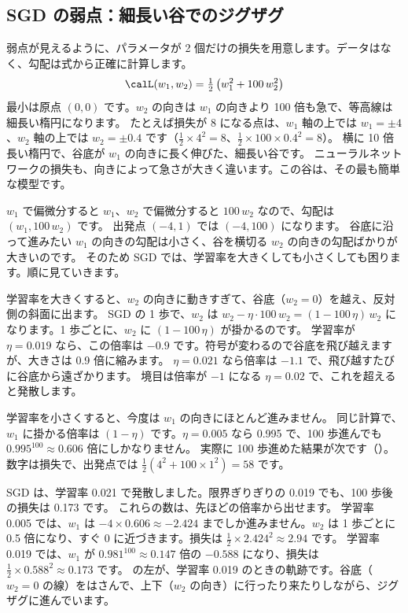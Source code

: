 \subsection*{SGD の弱点：細長い谷でのジグザグ}

弱点が見えるように、パラメータが 2 個だけの損失を用意します。データはなく、勾配は式から正確に計算します。
\begin{equation}
\calL(w_1, w_2)=\tfrac{1}{2}\left(w_1^2+100\,w_2^2\right)
\label{eq:training-valley}
\end{equation}
最小は原点 $(0,0)$ です。$w_2$ の向きは $w_1$ の向きより 100 倍も急で、等高線は細長い楕円になります。
たとえば損失が 8 になる点は、$w_1$ 軸の上では $w_1=\pm4$、$w_2$ 軸の上では $w_2=\pm0.4$ です（$\frac12\times4^2=8$、$\frac12\times100\times0.4^2=8$）。
横に 10 倍長い楕円で、谷底が $w_1$ の向きに長く伸びた、細長い谷です。
ニューラルネットワークの損失も、向きによって急さが大きく違います。この谷は、その最も簡単な模型です。

$w_1$ で偏微分すると $w_1$、$w_2$ で偏微分すると $100\,w_2$ なので、勾配は $(w_1, 100\,w_2)$ です。
出発点 $(-4, 1)$ では $(-4, 100)$ になります。
谷底に沿って進みたい $w_1$ の向きの勾配は小さく、谷を横切る $w_2$ の向きの勾配ばかりが大きいのです。
そのため SGD では、学習率を大きくしても小さくしても困ります。順に見ていきます。

学習率を大きくすると、$w_2$ の向きに動きすぎて、谷底（$w_2=0$）を越え、反対側の斜面に出ます。
SGD の 1 歩で、$w_2$ は $w_2-\eta\cdot100\,w_2=(1-100\,\eta)\,w_2$ になります。1 歩ごとに、$w_2$ に $(1-100\,\eta)$ が掛かるのです。
学習率が $\eta=0.019$ なら、この倍率は $-0.9$ です。符号が変わるので谷底を飛び越えますが、大きさは 0.9 倍に縮みます。
$\eta=0.021$ なら倍率は $-1.1$ で、飛び越すたびに谷底から遠ざかります。
境目は倍率が $-1$ になる $\eta=0.02$ で、これを超えると発散します。

学習率を小さくすると、今度は $w_1$ の向きにほとんど進みません。
同じ計算で、$w_1$ に掛かる倍率は $(1-\eta)$ です。$\eta=0.005$ なら 0.995 で、100 歩進んでも $0.995^{100}\approx0.606$ 倍にしかなりません。
実際に 100 歩進めた結果が次です（）。数字は損失で、出発点では $\frac12(4^2+100\times1^2)=58$ です。


SGD は、学習率 0.021 で発散しました。限界ぎりぎりの 0.019 でも、100 歩後の損失は 0.173 です。
これらの数は、先ほどの倍率から出せます。
学習率 0.005 では、$w_1$ は $-4\times0.606\approx-2.424$ までしか進みません。$w_2$ は 1 歩ごとに 0.5 倍になり、すぐ 0 に近づきます。損失は $\frac12\times2.424^2\approx2.94$ です。
学習率 0.019 では、$w_1$ が $0.981^{100}\approx0.147$ 倍の $-0.588$ になり、損失は $\frac12\times0.588^2\approx0.173$ です。
の左が、学習率 0.019 のときの軌跡です。谷底（$w_2=0$ の線）をはさんで、上下（$w_2$ の向き）に行ったり来たりしながら、ジグザグに進んでいます。

